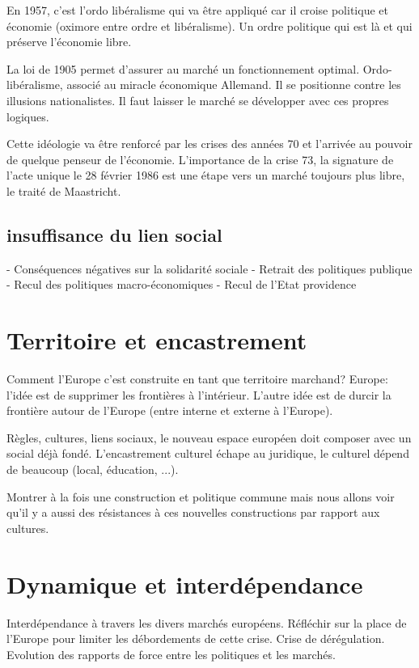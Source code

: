 En 1957, c'est l'ordo libéralisme qui va être appliqué car il croise politique et économie (oximore entre ordre et libéralisme). Un ordre politique qui est là et qui préserve l'économie libre.

La loi de 1905 permet d'assurer au marché un fonctionnement optimal. Ordo-libéralisme, associé au miracle économique Allemand. Il se positionne contre les illusions nationalistes. Il faut laisser le marché se développer avec ces propres logiques.

Cette idéologie va être renforcé par les crises des années 70 et l'arrivée au pouvoir de quelque penseur de l'économie. L'importance de la crise 73, la signature de l'acte unique le 28 février 1986 est une étape vers un marché toujours plus libre, le traité de Maastricht.

\subsection{insuffisance du lien social}

- Conséquences négatives sur la solidarité sociale
- Retrait des politiques publique
- Recul des politiques macro-économiques
- Recul de l'Etat providence










\section{Territoire et encastrement}

Comment l'Europe c'est construite en tant que territoire marchand? Europe: l'idée est de supprimer les frontières à l'intérieur. L'autre idée est de durcir la frontière autour de l'Europe (entre interne et externe à l'Europe).

Règles, cultures, liens sociaux, le nouveau espace européen doit composer avec un social déjà fondé. L'encastrement culturel échape au juridique, le culturel dépend de beaucoup (local, éducation, ...). 

Montrer à la fois une construction et politique commune mais nous allons voir qu'il y a aussi des résistances à ces nouvelles constructions par rapport aux cultures.

\section{Dynamique et interdépendance}

Interdépendance à travers les divers marchés européens. Réfléchir sur la place de l'Europe pour limiter les débordements de cette crise. Crise de dérégulation. Evolution des rapports de force entre les politiques et les marchés.
